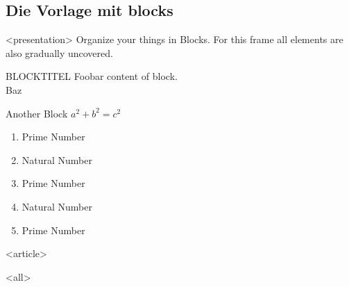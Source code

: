 \subsection{Die Vorlage mit blocks}
{%
\begin{frame}[<+->][fragile,t]



\mode
<presentation>
	Organize your things in Blocks. For this frame all elements are also gradually uncovered.

	\begin{block}{BLOCKTITEL}
		Foobar content of block. \\
		Baz
	\end{block}

	\begin{block}{Another Block}
		$a^2 + b^2 = c^2$
		\begin{enumerate}
			\item Prime Number
			\item Natural Number
			\item Prime Number
			\item Natural Number
			\item Prime Number
		\end{enumerate}
	\end{block}


\mode
<article>

\mode
<all>

\end{frame}
}

\newpage
